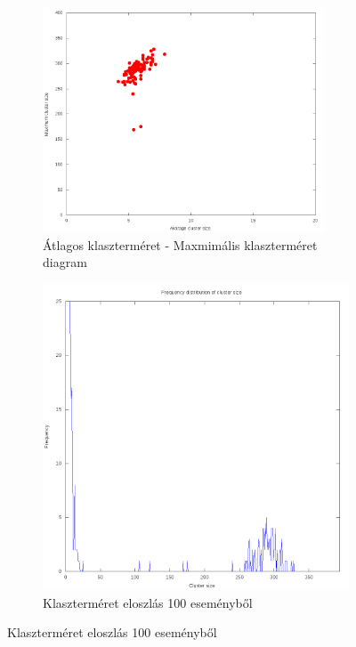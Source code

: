\documentclass[a4paper,12pt]{article}
\begin{document}
\begin{figure}[H]
	\centering
	\begin{subfigure}{.49\textwidth}
		\includegraphics[width=0.92\textwidth]{mean-max12_80.png}
		\caption{ Átlagos klaszterméret - Maxmimális klaszterméret diagram }
	\end{subfigure}
	\begin{subfigure}{.49\textwidth}
		\includegraphics[width=.92\textwidth]{distribution_zoomed_12_80.png}
		\caption{ Klaszterméret eloszlás 100 eseményből } 
	\end{subfigure}
\end{figure}
\end{document}
